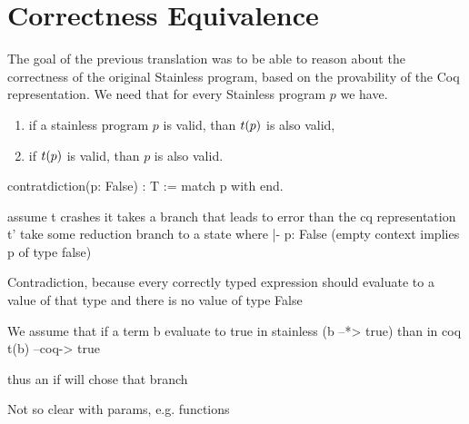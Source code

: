\section{Correctness Equivalence}

The goal of the previous translation was to be able to reason about the correctness of the original Stainless program, based on the provability of the Coq representation. We need that for every Stainless program $p$ we have.

\begin{enumerate}
	\item if a stainless program $p$ is valid, than $t(p)$ is also valid,
	\item if $t(p)$ is valid, than $p$ is also valid.
\end{enumerate}

contratdiction(p: False) : T := match p with
end.

assume t crashes
it takes a branch that leads to error
than the cq representation t' take some reduction branch to a state where
{} |- p: False (empty context implies p of type false)

Contradiction, because every correctly typed expression should evaluate to a value of that type and there is no value of type False

We assume that if a term b evaluate to true in stainless (b --*> true) than in coq t(b) --coq-> true
 

thus an if will chose that branch

Not so clear with params, e.g. functions